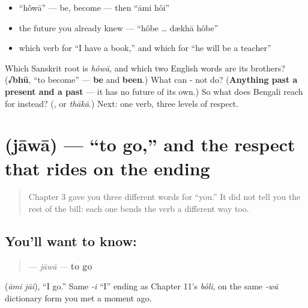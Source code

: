 \begin{itemize}
\raggedright
  \item \textquotedblleft{}hôwā\textquotedblright{} — be, become — then \textquotedblleft{}āmi hôi\textquotedblright{}
  \item the future you already knew — \textquotedblleft{}hôbe … dækhā hôbe\textquotedblright{}
  \item which verb for \textquotedblleft{}I have a book,\textquotedblright{} and which for \textquotedblleft{}he will be a teacher\textquotedblright{}
\end{itemize}

\begin{tcolorbox}[breakable,colback=teal!4,colframe=teal!35!black,title={Before you move on}]
Which Sanskrit root is \emph{hôwā}, and which two English words are its brothers? (\textbf{√bhū}, \textquotedblleft{}to become\textquotedblright{} — \textbf{be} and \textbf{been}.) What can - not do? (\textbf{Anything past a present and a past} — it has no future of its own.) So what does Bengali reach for instead? (\textbf{}, or \emph{thākā}.) Next: one verb, three levels of respect.
\end{tcolorbox}
\section[\texorpdfstring{\bn{যাওয়া} (jāwā)}{যাওয়া (jāwā)}]{ (jāwā) — \textquotedblleft{}to go,\textquotedblright{} and the respect that rides on the ending}

\label{lesson:BN-C07-jaowa}



\begin{quote}
Chapter 3 gave you three different words for \textquotedblleft{}you.\textquotedblright{} It did not tell you the rest of the bill: each one bends the verb a different way too.
\end{quote}

\subsection*{You'll want to know: }
\begin{quote}
\textbf{} — \emph{jāwā} — \textbf{to go}
\end{quote}

  (\emph{āmi jāi}), \textquotedblleft{}I go.\textquotedblright{} Same \emph{-i} \textquotedblleft{}I\textquotedblright{} ending as Chapter 11's \emph{bôli}, on the same \emph{-wā} dictionary form you met a moment ago.

